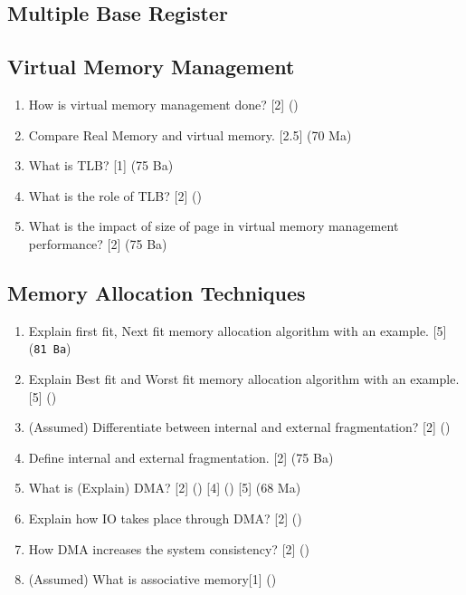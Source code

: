 \documentclass[12pt]{article}
\begin{document}
	\subsection{Multiple Base Register}
	\subsection{Virtual Memory Management}
		\begin{enumerate}
			\item How is virtual memory management done? \hfill [2] ()

			\item Compare Real Memory and virtual memory. \hfill [2.5] (70 Ma)
			
			\item What is TLB? \hfill [1] (75 Ba)
			
			\item What is the role of TLB? \hfill [2] ()

			\item What is the impact of size of page in virtual memory management performance? \hfill [2] (75 Ba)
		\end{enumerate}
	
	\subsection{Memory Allocation Techniques}
		\begin{enumerate}
			\item Explain first fit, Next fit memory allocation algorithm with an example. \hfill [5] (\texttt{81 Ba})

			\item Explain Best fit and Worst fit memory allocation algorithm with an example. \hfill [5] ()

			\item (Assumed) Differentiate between internal and external fragmentation? \hfill [2] ()

			\item Define internal and external fragmentation. \hfill [2] (75 Ba)

			\item What is (Explain) DMA? \hfill [2] () [4] () [5] (68 Ma)

			\item Explain how IO takes place through DMA? \hfill [2] ()

			\item How DMA increases the system consistency? \hfill [2] ()

			\item (Assumed) What is associative memory\hfill [1] ()
		\end{enumerate}
\end{document}
